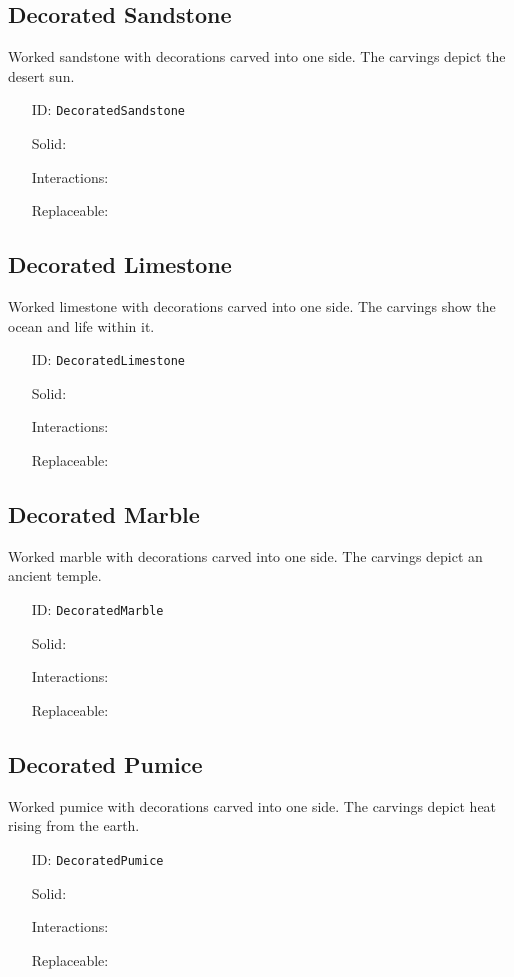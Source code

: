 \subsection{Decorated Sandstone}\label{subsec:blocks_decorated sandstone}
Worked sandstone with decorations carved into one side.
                The carvings depict the desert sun.
\newline
\begin{itemize}[nosep]
\item[ID:] \texttt{DecoratedSandstone}
\item[Solid:]  \Checkmark \item[Interactions:]  \XSolidBrush \item[Replaceable:]  \XSolidBrush \end{itemize}

\subsection{Decorated Limestone}\label{subsec:blocks_decorated limestone}
Worked limestone with decorations carved into one side.
                The carvings show the ocean and life within it.
\newline
\begin{itemize}[nosep]
\item[ID:] \texttt{DecoratedLimestone}
\item[Solid:]  \Checkmark \item[Interactions:]  \XSolidBrush \item[Replaceable:]  \XSolidBrush \end{itemize}

\subsection{Decorated Marble}\label{subsec:blocks_decorated marble}
Worked marble with decorations carved into one side.
                The carvings depict an ancient temple.
\newline
\begin{itemize}[nosep]
\item[ID:] \texttt{DecoratedMarble}
\item[Solid:]  \Checkmark \item[Interactions:]  \XSolidBrush \item[Replaceable:]  \XSolidBrush \end{itemize}

\subsection{Decorated Pumice}\label{subsec:blocks_decorated pumice}
Worked pumice with decorations carved into one side.
                The carvings depict heat rising from the earth.
\newline
\begin{itemize}[nosep]
\item[ID:] \texttt{DecoratedPumice}
\item[Solid:]  \Checkmark \item[Interactions:]  \XSolidBrush \item[Replaceable:]  \XSolidBrush \end{itemize}

